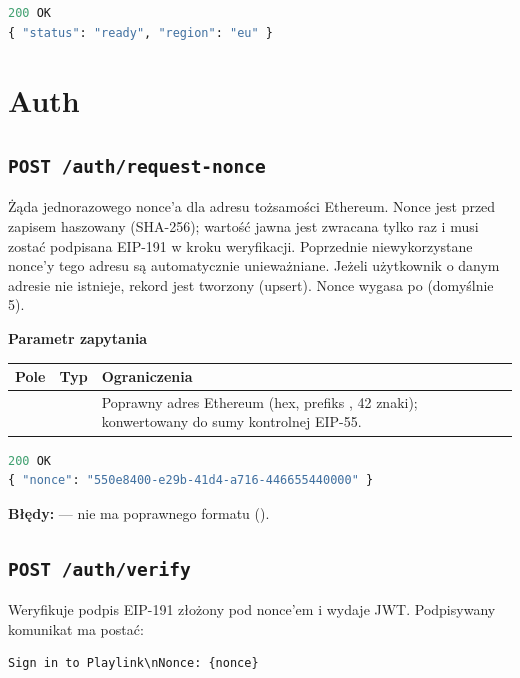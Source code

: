 \begin{lstlisting}[language=Python]
200 OK
{ "status": "ready", "region": "eu" }
\end{lstlisting}

\section{Auth}
\label{sec:api-auth-endpointy}

\subsection{\texttt{POST /auth/request-nonce}}

Żąda jednorazowego nonce'a dla adresu tożsamości Ethereum. Nonce jest przed zapisem haszowany
(SHA-256); wartość jawna jest zwracana tylko raz i musi zostać podpisana EIP-191 
w kroku weryfikacji. Poprzednie niewykorzystane nonce'y tego adresu są automatycznie unieważniane.
Jeżeli użytkownik o danym adresie nie istnieje, rekord jest tworzony (upsert). Nonce wygasa po
 (domyślnie 5).

\textbf{Parametr zapytania}

\begin{tabularx}{\textwidth}{llY}
\toprule
Pole & Typ & Ograniczenia \\
\midrule
{} &  & Poprawny adres Ethereum (hex, prefiks , 42 znaki); konwertowany do sumy kontrolnej EIP-55. \\
\bottomrule
\end{tabularx}

\begin{lstlisting}[language=Python]
200 OK
{ "nonce": "550e8400-e29b-41d4-a716-446655440000" }
\end{lstlisting}

\textbf{Błędy:}  ---  nie ma poprawnego formatu
().

\subsection{\texttt{POST /auth/verify}}

Weryfikuje podpis EIP-191  złożony pod nonce'em i wydaje JWT. Podpisywany
komunikat ma postać:

\begin{lstlisting}
Sign in to Playlink\nNonce: {nonce}
\end{lstlisting}

